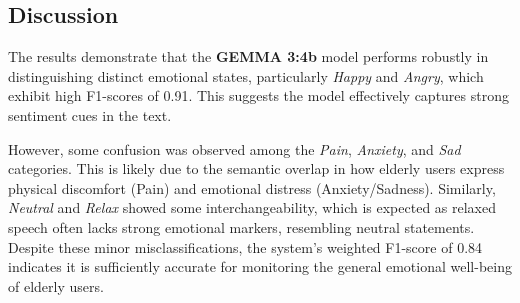 \begin{table}[ht]
    \centering
    \caption{Confusion Matrix of Predicted vs. True Emotions.}
    \label{tab:confusion_matrix}
\end{table}

\subsection{Discussion}
The results demonstrate that the \textbf{GEMMA 3:4b} model performs robustly in distinguishing distinct emotional states, particularly \textit{Happy} and \textit{Angry}, which exhibit high F1-scores of 0.91. This suggests the model effectively captures strong sentiment cues in the text.

However, some confusion was observed among the \textit{Pain}, \textit{Anxiety}, and \textit{Sad} categories. This is likely due to the semantic overlap in how elderly users express physical discomfort (Pain) and emotional distress (Anxiety/Sadness). Similarly, \textit{Neutral} and \textit{Relax} showed some interchangeability, which is expected as relaxed speech often lacks strong emotional markers, resembling neutral statements. Despite these minor misclassifications, the system's weighted F1-score of 0.84 indicates it is sufficiently accurate for monitoring the general emotional well-being of elderly users.
